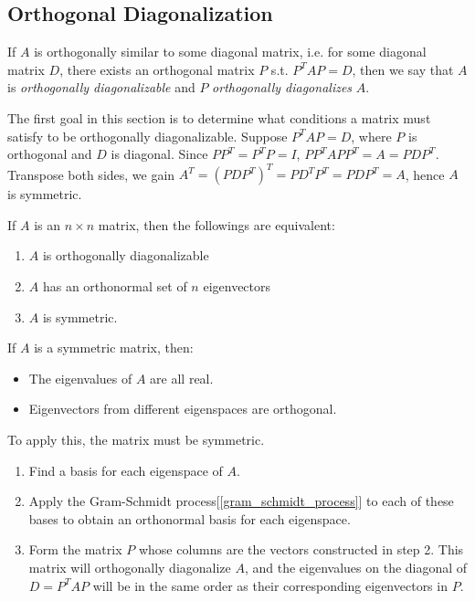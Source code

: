 \documentclass{report}
\begin{document}
		\subsection{Orthogonal Diagonalization}
		\begin{defn}
			If $A$ is orthogonally similar to some diagonal matrix, i.e. for some diagonal matrix $D$, there exists an orthogonal matrix $P$ s.t. $P^TAP=D$, then we say that $A$ is \emph{orthogonally diagonalizable} and $P$ \emph{orthogonally diagonalizes} $A$.
		\end{defn}
		
		The first goal in this section is to determine what conditions a matrix must satisfy to be orthogonally diagonalizable. Suppose $P^TAP=D$, where $P$ is orthogonal and $D$ is diagonal. Since $PP^T=P^TP=I$, $PP^TAPP^T=A=PDP^T$. Transpose both sides, we gain $A^T=(PDP^T)^T=PD^TP^T=PDP^T=A$, hence $A$ is symmetric.
		
		\begin{thm}
			If $A$ is an $n \times n$ matrix, then the followings are equivalent:
			\begin{enumerate}
				\item $A$ is orthogonally diagonalizable
				\item $A$ has an orthonormal set of $n$ eigenvectors
				\item $A$ is symmetric.
			\end{enumerate}
		\end{thm}
		
		\begin{thm}
			If $A$ is a symmetric matrix, then:
			\begin{itemize}
				\item The eigenvalues of $A$ are all real.
				\item Eigenvectors from different eigenspaces are orthogonal.
			\end{itemize}
		\end{thm}
		
		\begin{mthd}
			To apply this, the matrix must be symmetric.
			\begin{enumerate}
				\item Find a basis for each eigenspace of $A$.
				\item Apply the Gram-Schmidt process[\ref{gram_schmidt_process}] to each of these bases to obtain an orthonormal basis for each eigenspace.
				\item Form the matrix $P$ whose columns are the vectors constructed in step 2. This matrix will orthogonally diagonalize $A$, and the eigenvalues on the diagonal of $D=P^TAP$ will be in the same order as their corresponding eigenvectors in $P$.
			\end{enumerate}
		\end{mthd}
		
\end{document}
